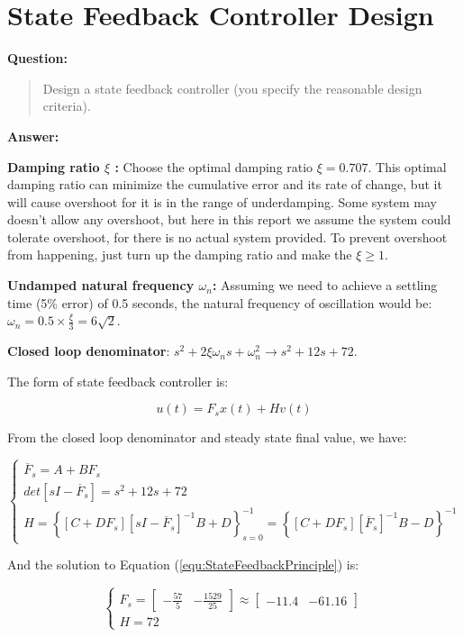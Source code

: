 \documentclass[12pt, oneside]{article}
\begin{document}
\section{State Feedback Controller Design}
\textbf{Question:}
\begin{quote}
Design a state feedback controller (you specify the reasonable design criteria).
\end{quote}
\textbf{Answer:}

 \textbf{Damping ratio $\xi$ :} Choose the optimal damping ratio $\xi=0.707$. This optimal damping ratio can minimize the cumulative error and its rate of change, but it will cause overshoot for it is in the range of underdamping. Some system may doesn't allow any overshoot, but here in this report we assume the system could tolerate overshoot, for there is no actual system provided. To prevent overshoot from happening, just turn up the damping ratio and make the $\xi \ge 1$.
 
 \textbf{Undamped natural frequency $\omega_n$:} Assuming we need to achieve a settling time (5\% error) of 0.5 seconds, the natural frequency of oscillation would be: $\omega_n = 0.5\times\frac{\xi}{3}=6\sqrt{2}.$

 \textbf{Closed loop denominator}: $s^2+2\xi\omega_{n}s+\omega_{n}^2 \rightarrow s^2+12s+72$.

The form of state feedback controller is:

\begin{equation}
    u(t) = F_{s}x(t)+Hv(t)
\end{equation}

 From the closed loop denominator and steady state final value, we have:

\begin{equation}
    \begin{cases}
        \overline{F}_s = A+BF_s\\
        det\left[sI-\overline{F}_s\right] = s^2+12s+72\\
        H = \left\{ \left[C+DF_s\right]\left[sI-\overline{F}_s\right]^{-1}B+D \right\}_{s=0}^{-1} = \left\{ \left[C+DF_s\right]\left[\overline{F}_s\right]^{-1}B-D \right\}^{-1}
    \end{cases}
    \label{equ:StateFeedbackPrinciple}
\end{equation}

And the solution to Equation (\ref{equ:StateFeedbackPrinciple}) is:
 
 \begin{equation}
     \begin{cases}
         F_s = \left[\begin{array}{ccc}-\frac{57}{5}&-\frac{1529}{25}\end{array}\right]\approx\left[\begin{array}{ccc}-11.4&-61.16\end{array}\right]\\
         H=72
     \end{cases}
 \end{equation}
\end{document}

